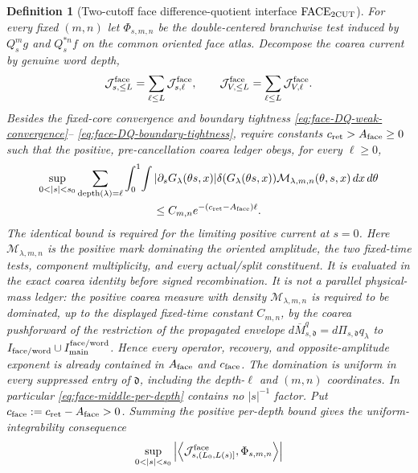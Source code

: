 \documentclass[11pt]{article}
\newtheorem{definition}[theorem]{Definition}
\begin{document}
\begin{definition}[Two-cutoff face difference-quotient interface
$\mathrm{FACE}_{\rm 2CUT}$]
\label{def:face-two-cutoff}
For every fixed $(m,n)$ let $\Phi_{s,m,n}$ be the double-centered
branchwise test induced by $Q_s^mg$ and $Q_s^{*n}f$ on the common oriented
face atlas.  Decompose the coarea current by genuine word depth,
\[
 \mathcal J_{s,\le L}^{\rm face}
   =\sum_{\ell\le L}\mathcal J_{s,\ell}^{\rm face},
 \qquad
 \mathcal J_{V,\le L}^{\rm face}
   =\sum_{\ell\le L}\mathcal J_{V,\ell}^{\rm face}.
\]
Besides the fixed-core convergence and boundary tightness
\eqref{eq:face-DQ-weak-convergence}--
\eqref{eq:face-DQ-boundary-tightness}, require constants
$c_{\rm ret}>A_{\rm face}\ge0$ such that the positive, pre-cancellation
coarea ledger obeys, for every $\ell\ge0$,
\begin{multline}
\label{eq:face-middle-per-depth}
 \sup_{0<|s|<s_0}
 \sum_{\operatorname{depth}(\lambda)=\ell}
 \int_0^1\!\int
 |\partial_sG_\lambda(\theta s,x)|
 \delta(G_\lambda(\theta s,x))
 \mathcal M_{\lambda,m,n}(\theta,s,x)\,dx\,d\theta\\
 \le C_{m,n}e^{-(c_{\rm ret}-A_{\rm face})\ell}.
\end{multline}
The identical bound is required for the limiting positive current at $s=0$.
Here $\mathcal M_{\lambda,m,n}$ is the positive mark dominating the oriented
amplitude, the two fixed-time tests, component multiplicity, and every
actual/split constituent.  It is evaluated in the exact coarea identity
before signed recombination.  It is not a parallel physical-mass ledger:
the positive coarea measure with density $\mathcal M_{\lambda,m,n}$ is
required to be dominated, up to the displayed fixed-time constant
$C_{m,n}$, by the coarea pushforward of the restriction of the propagated
envelope $d\overline M_{s,\mathfrak d}^{q}
=d\Pi_{s,\mathfrak d}q_\lambda$ to
$I_{\rm face/word}\cup I_{\rm main}^{\rm face/word}$.  Hence every operator,
recovery, and opposite-amplitude exponent is already contained in
$A_{\rm face}$ and $c_{\rm face}$.  The domination is uniform in every
suppressed entry of $\mathfrak d$, including the depth-$\ell$ and $(m,n)$
coordinates.  In particular
\eqref{eq:face-middle-per-depth} contains no $|s|^{-1}$ factor.  Put
$c_{\rm face}:=c_{\rm ret}-A_{\rm face}>0$.  Summing the positive
per-depth bound gives the uniform-integrability consequence
\begin{multline}
\label{eq:face-middle-tail}
 \sup_{0<|s|<s_0}
 \left|\left\langle
 \mathcal J_{s,(L_0,L(s)]}^{\rm face},\Phi_{s,m,n}
 \right\rangle\right|

\end{multline}
\end{definition}
\end{document}
